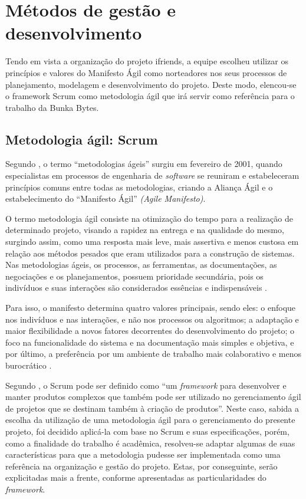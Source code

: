 \section{Métodos de gestão e desenvolvimento}
\label{metodologia agil}
Tendo em vista a organização do projeto \gls{ifriends}, a equipe escolheu utilizar os princípios e valores do Manifesto Ágil como norteadores nos seus processos de planejamento, modelagem e desenvolvimento do projeto. Deste modo, elencou-se  o \gls{framework} Scrum como metodologia ágil que irá servir como referência para o trabalho da Bunka Bytes.

\subsection{Metodologia ágil: Scrum}
Segundo , o termo “metodologias ágeis” surgiu em fevereiro de 2001, quando  especialistas em processos de engenharia de \textsl{software} se reuniram e estabeleceram princípios comuns entre todas as metodologias, criando a Aliança Ágil e o estabelecimento do ``Manifesto Ágil'' \textsl{(Agile Manifesto)}.

O termo metodologia ágil consiste na otimização do tempo para a realização de determinado projeto, visando a rapidez na entrega e na qualidade do mesmo, surgindo assim, como uma resposta mais leve, mais assertiva e menos custosa em relação aos métodos pesados que eram utilizados para a construção de sistemas. Nas metodologias ágeis, os processos, as ferramentas, as documentações, as negociações e os planejamentos, possuem prioridade secundária, pois os indivíduos e suas interações são considerados essências e indispensáveis \cite{sganderla2016aprimorando}.

Para isso, o manifesto determina quatro valores principais, sendo eles: o enfoque nos indivíduos e nas interações, e não nos processos ou algoritmos; a adaptação e maior flexibilidade a novos fatores decorrentes do desenvolvimento do projeto; o foco na funcionalidade do sistema e na documentação mais simples e objetiva, e por último, a preferência por um ambiente de trabalho mais colaborativo e menos burocrático  \cite{sganderla2016aprimorando}. 

Segundo , o Scrum pode ser definido como ``um \textsl{\gls{framework}} para desenvolver e manter produtos complexos que também pode ser utilizado no gerenciamento ágil de projetos que se destinam também à criação de produtos''. Neste caso, sabida a escolha da utilização de uma metodologia ágil para o gerenciamento do presente projeto, foi decidido aplicá-la com base no Scrum e suas especificações, porém, como a finalidade do trabalho é acadêmica, resolveu-se adaptar algumas de suas características para que a metodologia pudesse ser implementada como uma referência na organização e gestão do projeto. Estas, por conseguinte, serão explicitadas mais a frente, conforme apresentadas as particularidades do \textsl{\gls{framework}}.

